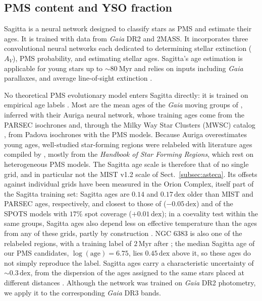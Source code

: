 \documentclass{aa}
\begin{document}
\subsection{PMS content and YSO fraction}\label{subsec:sagitta}
Sagitta is a neural network designed to classify stars as PMS and estimate their ages. It is trained with data from \textit{Gaia} DR2 and 2MASS\@. It incorporates three convolutional neural networks each dedicated to determining stellar extinction ($A_V$), PMS probability, and estimating stellar ages. Sagitta's age estimation is applicable for young stars up to $\sim 80~\mathrm{Myr}$ and relies on inputs including \textit{Gaia} parallaxes, and average line-of-sight extinction \citep{2021AJ....162..282M}.

No theoretical PMS evolutionary model enters Sagitta directly: it is trained on empirical age labels \citep{2021AJ....162..282M}. Most are the mean ages of the \textit{Gaia} moving groups of \citet{2020AJ....160..279K}, inferred with their Auriga neural network, whose training ages come from the PARSEC isochrones \citep{2017ApJ...835...77M} and, through the Milky Way Star Clusters (MWSC) catalog \citep{2013A&A...558A..53K}, from Padova isochrones with the \citet{2000A&A...358..593S} PMS models. Because Auriga overestimates young ages, well-studied star-forming regions were relabeled with literature ages compiled by \citet{2021AJ....162..282M}, mostly from the \textit{Handbook of Star Forming Regions}, which rest on heterogeneous PMS models. The Sagitta age scale is therefore that of no single grid, and in particular not the \textsc{MIST} v1.2 scale of Sect.~\ref{subsec:asteca}. Its offsets against individual grids have been measured in the Orion Complex, itself part of the Sagitta training set: Sagitta ages are $0.14$ and $0.17\,\mathrm{dex}$ older than \textsc{MIST} and PARSEC ages, respectively, and closest to those of \citet{2015A&A...577A..42B} ($-0.05\,\mathrm{dex}$) and of the SPOTS models \citep{2020ApJ...891...29S} with $17\%$ spot coverage ($+0.01\,\mathrm{dex}$); in a coevality test within the same groups, Sagitta ages also depend less on effective temperature than the ages from any of these grids, partly by construction \citep{2023AJ....165..182K}. NGC 6383 is also one of the relabeled regions, with a training label of $2\,\mathrm{Myr}$ after \citet{2008hsf2.book..497R}; the median Sagitta age of our PMS candidates, $\log(\mathrm{age})=6.75$, lies $0.45\,\mathrm{dex}$ above it, so these ages do not simply reproduce the label. Sagitta ages carry a characteristic uncertainty of $\sim0.3\,\mathrm{dex}$, from the dispersion of the ages assigned to the same stars placed at different distances \citep{2021AJ....162..282M}. Although the network was trained on \textit{Gaia} DR2 photometry, we apply it to the corresponding \textit{Gaia} DR3 bands.
\end{document}
